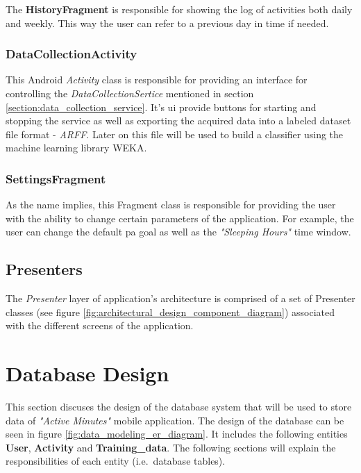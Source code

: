             The \textbf{HistoryFragment} is responsible for showing the log of activities both daily and weekly. This way the user can refer to a previous day in time if needed.
            
            \subsubsection{DataCollectionActivity}
            This Android \textit{Activity} class is responsible for providing an interface for controlling the \textit{DataCollectionSertice} mentioned in section \ref{section:data_collection_service}. It's \gls{ui} provide buttons for starting and stopping the service as well as exporting the acquired data into a labeled dataset file format - \textit{ARFF}. Later on this file will be used to build a classifier using the machine learning library WEKA.
            
            \subsubsection{SettingsFragment}
            As the name implies, this Fragment class is responsible for providing the user with the ability to change certain parameters of the application. For example, the user can change the default \gls{pa} goal as well as the \textit{"Sleeping Hours"} time window.
            
            
        \subsection{Presenters}
        The \textit{Presenter} layer of application's architecture is comprised of a set of Presenter classes (see figure  \ref{fig:architectural_design_component_diagram}) associated with the different screens of the application.
    
    \section{Database Design}
    \label{section:database-design}
    This section discuses the design of the database system that will be used to store data of \textit{"Active Minutes"} mobile application. The design of the database can be seen in figure \ref{fig:data_modeling_er_diagram}. It includes the following entities \textbf{User}, \textbf{Activity} and \textbf{Training\_data}. The following sections will explain the responsibilities of each entity (i.e.\ database tables).
        
